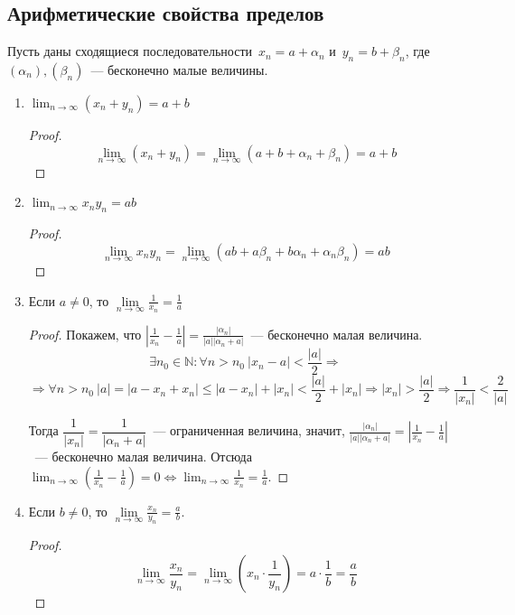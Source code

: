 \subsection{Арифметические свойства пределов}
Пусть даны сходящиеся последовательности~$x_n = a + \alpha_n$ и~$y_n = b + \beta_n$, где $(\alpha_n), (\beta_n)$~--- бесконечно малые величины.
\begin{enumerate}
	\item $\displaystyle \lim_{n \to \infty} (x_n + y_n) = a + b$
	\begin{proof}
	\begin{equation*}
	\lim_{n \to \infty} (x_n + y_n) = \lim_{n \to \infty} (a + b + \alpha_n + \beta_n) = a + b
	\end{equation*}
	\end{proof}
	
	\item $\displaystyle \lim_{n \to \infty} x_n y_n = ab$
	\begin{proof}
	\begin{equation*}
	\lim_{n \to \infty} x_n y_n = \lim_{n \to \infty} (ab + a\beta_n + b\alpha_n + \alpha_n \beta_n) = ab
	\end{equation*}
	\end{proof}
	
	\item Если $a \neq 0$, то $\lim\limits_{n \to \infty} \frac1{x_n} = \frac1a$
	\begin{proof}
	Покажем, что $\displaystyle \left| \frac1{x_n} - \frac1a \right| = \frac{|\alpha_n|}{|a||\alpha_n + a|}$~--- бесконечно малая величина.
	\begin{equation*}
	\exists n_0 \in \mathbb N \colon \forall n > n_0 \ |x_n - a| < \frac{|a|}2 \Rightarrow
	\end{equation*}
	\begin{equation*}
	\Rightarrow \forall n > n_0 \ |a| = |a - x_n + x_n| \leqslant |a - x_n| + |x_n| < \frac{|a|}2 + |x_n| \Rightarrow |x_n| > \frac{|a|}2 \Rightarrow \frac1{|x_n|} < \frac2{|a|}
	\end{equation*}
	
	Тогда $\dfrac1{|x_n|} = \dfrac1{|\alpha_n + a|}$~--- ограниченная величина, значит,
	$\displaystyle \frac{|\alpha_n|}{|a||\alpha_n + a|} = \left| \frac1{x_n} - \frac1a \right|$~--- бесконечно малая величина.
	Отсюда $\displaystyle \lim_{n \to \infty} \left( \frac1{x_n} - \frac1a \right) = 0 \Leftrightarrow \lim_{n \to \infty} \frac1{x_n} = \frac1a$.
	\end{proof}
	
	\item Если $b \neq 0$, то $\lim\limits_{n \to \infty} \frac{x_n}{y_n} = \frac{a}b$.
	\begin{proof}
	\begin{equation*}
	\lim_{n \to \infty} \frac{x_n}{y_n} =
	\lim_{n \to \infty} \left( x_n \cdot \frac1{y_n} \right) =
	a \cdot \frac1b = \frac{a}b
	\end{equation*}
	\end{proof}
\end{enumerate}

